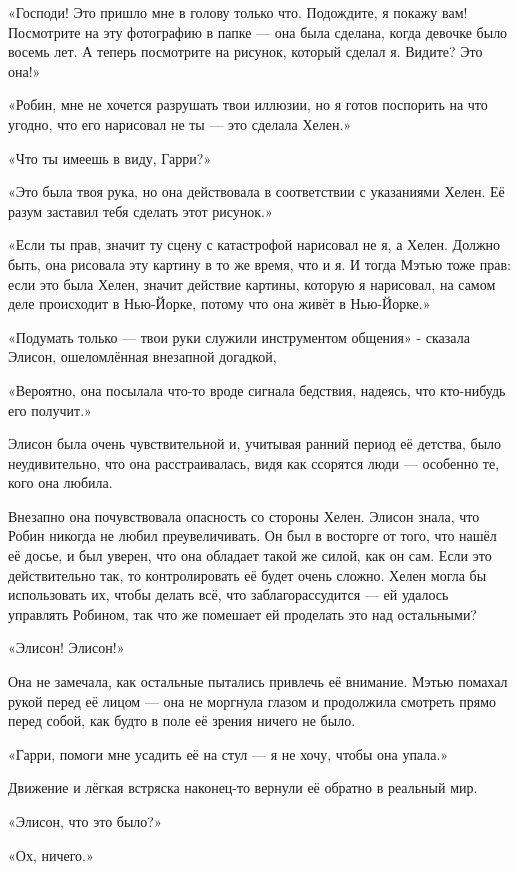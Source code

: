 \documentclass[a5paper, 9pt,
final, openany, twoside=true]{memoir}
\begin{document}
«Господи! Это пришло мне в голову только что. Подождите, я покажу вам! Посмотрите на эту фотографию в папке — она была сделана, когда девочке было восемь лет. А теперь посмотрите на рисунок, который сделал я. Видите? Это она!»

«Робин, мне не хочется разрушать твои иллюзии, но я готов поспорить на что угодно, что его нарисовал не ты — это сделала Хелен.»

«Что ты имеешь в виду, Гарри?»

«Это была твоя рука, но она действовала в соответствии с указаниями Хелен. Её разум заставил тебя сделать этот рисунок.»

«Если ты прав, значит ту сцену с катастрофой нарисовал не я, а Хелен. Должно быть, она рисовала эту картину в то же время, что и я. И тогда Мэтью тоже прав: если это была Хелен, значит действие картины, которую я нарисовал, на самом деле происходит в Нью-Йорке, потому что она живёт в Нью-Йорке.»

«Подумать только — твои руки служили инструментом общения» - сказала Элисон, ошеломлённая внезапной догадкой,

«Вероятно, она посылала что-то вроде сигнала бедствия, надеясь, что кто-нибудь его получит.»\bigskip

Элисон была очень чувствительной и, учитывая ранний период её детства, было неудивительно, что она расстраивалась, видя как ссорятся люди — особенно те, кого она любила.

Внезапно она почувствовала опасность со стороны Хелен. Элисон знала, что Робин никогда не любил преувеличивать. Он был в восторге от того, что нашёл её досье, и был уверен, что она обладает такой же силой, как он сам. Если это действительно так, то контролировать её будет очень сложно. Хелен могла бы использовать их, чтобы делать всё, что заблагорассудится — ей удалось управлять Робином, так что же помешает ей проделать это над остальными?

«Элисон! Элисон!»

Она не замечала, как остальные пытались привлечь её внимание. Мэтью помахал рукой перед её лицом — она не моргнула глазом и продолжила смотреть прямо перед собой, как будто в поле её зрения ничего не было.

«Гарри, помоги мне усадить её на стул — я не хочу, чтобы она упала.»

Движение и лёгкая встряска наконец-то вернули её обратно в реальный мир.

«Элисон, что это было?»

«Ох, ничего.»
\end{document}
